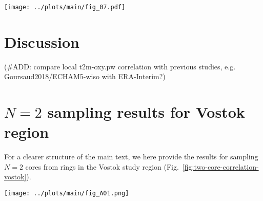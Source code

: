 \documentclass[cp, manuscript]{copernicus}
\begin{document}
\begin{figure*}[t]%
\centering
\texttt{[image: ../plots/main/fig\_07.pdf]}
\caption{%
  Correlation increase and risk of adverse sampling. (\textbf{a}) The increase
  in expected correlation with the target temperature at the EDML (red) and
  Vostok (blue) sites depending on the number of sites for averaging
  $\delta^{18}\mathrm{O}^{\mathrm{(pw)}}$ time series. Sampling is performed
  either from the innermost ring only (dashed lines), or from all possible
  individual combinations of sites for the respective optimal ring combination
  determined for each number of sites (solid lines). (\textbf{b}) Histogram of
  all possible individual correlations for sampling from the optimal ring
  combination for averaging $N=2$ sites compared to the correlation (vertical
  lines) for sampling from the innermost ring only, displayed for the EDML (red)
  and Vostok (blue) target sites.}
\label{fig:cor.increase.risk}%
\end{figure*}%

\section{Discussion}\label{discussion}

(\#ADD: compare local t2m-oxy.pw correlation with previous studies,
e.g. Goursaud2018/ECHAM5-wiso with ERA-Interim?)


\appendix

\section{$N=2$ sampling results for Vostok region}
\label{app:vostok.n2}

For a clearer structure of the main text, we here provide the results for
sampling $N=2$ cores from rings in the Vostok study region
(Fig.~\ref{fig:two-core-correlation-vostok}).

\begin{figure*}[t]%
\centering
\texttt{[image: ../plots/main/fig\_A01.png]}
\caption{%
  The expected correlation with the target site temperature for the average of
  two cores in the Vostok region. Shown is the mean correlation of all possible
  single correlations from averaging two grid cells of (\textbf{a})
  $T_{\mathrm{2m}}$, (\textbf{b}) $T_{\mathrm{2m}}^{\mathrm{(pw)}}$ and
  (\textbf{c}) $\delta^{18}\mathrm{O}^{\mathrm{(pw)}}$ time series sampled from
  the same or from two different rings, averaged over all target sites in
  the given region. The axes display the distance from the target, where the $x$
  ($y$) axis stands for the first (second) sampled ring and tickmarks
  indicate the radius of the midpoints of the rings. Note that for
  $\delta^{18}\mathrm{O}^{\mathrm{(pw)}}$ the -- albeit marginal -- correlation
  maximum is located for combining the innermost ring with the ring between
  $500$--$750$\,km.}
\label{fig:two-core-correlation-vostok}%
\end{figure*}%
\end{document}
